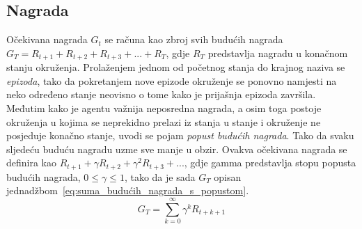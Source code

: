 \subsection{Nagrada}
Očekivana nagrada $G_t$ se računa kao zbroj svih budućih nagrada $G_T = R_{t+1}+R_{t+2}+R_{t+3}+ ... + R_T$, gdje $R_T$ predstavlja nagradu u konačnom stanju okruženja. Prolaženjem jednom od početnog stanja do krajnog naziva se \emph{epizoda}, tako da pokretanjem nove epizode okruženje se ponovno namjesti na neko određeno stanje neovisno o tome kako je prijašnja epizoda završila. Međutim kako je agentu važnija neposredna nagrada, a osim toga postoje okruženja u kojima se neprekidno prelazi iz stanja u stanje i okruženje ne posjeduje konačno stanje, uvodi se pojam \emph{popust budućih nagrada}. Tako da svaku sljedeću buduću nagradu uzme sve manje u obzir. Ovakva očekivana nagrada se definira kao $R_{t+1} + \gamma R_{t+2} + \gamma ^2 R_{t+3}+...$, gdje gamma predstavlja stopu popusta budućih nagrada, $0 \leq \gamma \leq 1$, tako da je sada $G_T$ opisan jednadžbom~\ref{eq:suma_budućih_nagrada_s_popustom}.
\begin{equation}\label{eq:suma_budućih_nagrada_s_popustom}
	G_T = \sum_{k=0}^{\infty} \gamma^k R_{t+k+1}
\end{equation}

